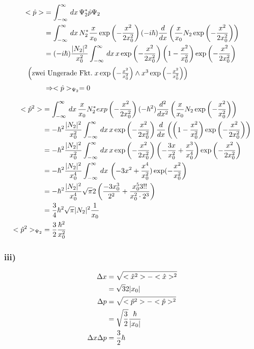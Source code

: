 \begin{align}
    <\hat p > &= \int_{-\infty}^{\infty}\,dx\, \Psi _2^*\hat p \Psi _2\\
    &=\int_{-\infty}^{\infty}\,dx\, N_2^* \frac{x}{x_0} \exp\left(-\frac{x^2}{2x_0^2}\right) (-i\hbar) \frac{d}{dx}\left(\frac{x}{x_0} N_2 \exp \left(-\frac{x^2}{2x_0^2}\right)\right) \\
    &=(-i\hbar) \frac{\lvert N_2\rvert^2}{x_0^2} \int_{-\infty}^{\infty} \,dx\,x\exp\left(-\frac{x^2}{2x_0^2}\right) \left(1-\frac{x^2}{x_0^2}\right)\exp\left(-\frac{x^2}{2x_0^2}\right)\\
    \intertext{
        $\left(\text{zwei Ungerade Fkt.}\; x \exp\left(-\frac{x^2}{x_0^2} \right) \wedge x^3 \exp\left(-\frac{x^2}{x_0^2} \right) \right)$
    }
    &\Rightarrow <\hat p >_{\Psi _2}=0
\end{align}

\begin{align}
    <\hat p ^2> &= \int_{-\infty}^{\infty}\,dx\, \frac{x}{x_0} N_2^* exp\left(-\frac{x^2}{2x_0^2}\right) (-\hbar^2) \frac{d^2}{dx^2}\left(\frac{x}{x_0} N_2 \exp\left(-\frac{x^2}{x_0^2}\right) \right)\\
    &= - \hbar ^2 \frac{\lvert N_2\rvert^2}{x_0^2} \int_{-\infty}^{\infty}\,dx\, x \exp\left(-\frac{x^2}{2x_0^2}\right)\frac{d}{dx}\left(\left(1-\frac{x^2}{x_0^2}\right)\exp\left(-\frac{x^2}{2x_0^2}\right) \right)\\
    &= - \hbar ^2 \frac{\lvert N_2\rvert^2}{x_0^2} \int_{-\infty}^{\infty}\,dx\, x \exp\left(-\frac{x^2}{2x_0^2}\right)\left(\--\frac{3x}{x_0^2}+\frac{x^3}{x_0^4} \right) \exp\left(-\frac{x^2}{2x_0^2}\right)\\
    &= - \hbar^2 \frac{\lvert N_2\rvert^2}{x_0^4} \int_{-\infty}^{\infty}\,dx\, \left(-3x^2+\frac{x^4}{x_0^2})\exp(-\frac{x^2}{x_0^2}\right)\\
    &= - \hbar^2 \frac{\lvert N_2\rvert^2}{x_0^4} \sqrt{\pi} 2\left(\frac{-3x_0^3}{2^2}+\frac{x_0^5 3!!}{x_0^2\cdot 2^3}\right)\\
    &= \frac{3}{4} \hbar^2 \sqrt{\pi} \lvert N_2\rvert^2 \frac{1}{x_0}\\
    <\hat p ^2 >_{\Psi _2}&=\frac{3}{2} \frac{\hbar ^2}{x_0^2}
\end{align}

\subsubsection{iii)}
\begin{align}
\Delta x&= \sqrt{<\hat x ^2>-<\hat x>^2 }\\
&=\sqrt{3}{2} \lvert x_0\rvert\\
\Delta p &= \sqrt{<\hat p ^2>-<\hat p >^2}\\
&=\sqrt{\frac{3}{2}}\frac{\hbar}{\lvert x_0\rvert}\\
\Delta x \Delta p &= \frac{3}{2} \hbar 
\end{align}

